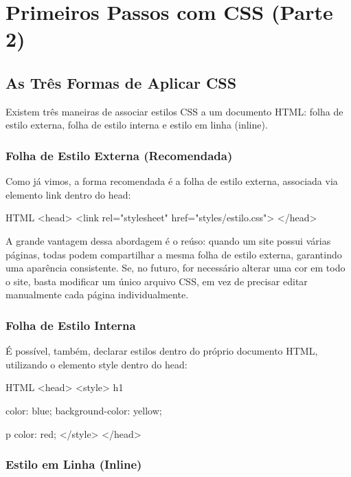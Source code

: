 \chapter{Primeiros Passos com CSS (Parte 2)}

\section{As Três Formas de Aplicar CSS}

Existem três maneiras de associar estilos CSS a um documento HTML: folha de estilo externa, folha de estilo interna e estilo em linha (inline).

\subsection{Folha de Estilo Externa (Recomendada)}

Como já vimos, a forma recomendada é a folha de estilo externa, associada via elemento link dentro do head:

\begin{codebox}{HTML}
<head>
  <link rel="stylesheet" href="styles/estilo.css">
</head>
\end{codebox}

A grande vantagem dessa abordagem é o reúso: quando um site possui várias páginas, todas podem compartilhar a mesma folha de estilo externa, garantindo uma aparência consistente. Se, no futuro, for necessário alterar uma cor em todo o site, basta modificar um único arquivo CSS, em vez de precisar editar manualmente cada página individualmente.

\subsection{Folha de Estilo Interna}

É possível, também, declarar estilos dentro do próprio documento HTML, utilizando o elemento style dentro do head:

\begin{codebox}{HTML}
<head>
  <style>
    h1 {
       color: blue;
       background-color: yellow;



    }
    p {
      color: red;
    }
  </style>
</head>
\end{codebox}

\subsection{Estilo em Linha (Inline)}

